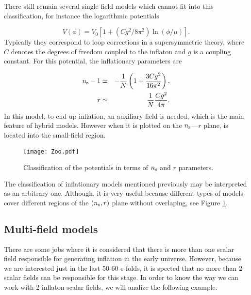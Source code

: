 \documentclass{rmaa}
\def\beq{\begin{equation}}
\def\eeq{\end{equation}}
\def\bea{\begin{eqnarray}}
\def\eea{\end{eqnarray}}
\begin{document}
There still remain several single-field models which cannot fit into this classification, 
for instance the logarithmic potentials \citep{Barrow2}

\beq
V\left(\phi\right) =V_0\left[1+(C g^2/8\pi^2)
\ln\left(\phi/\mu\right)\right].
\eeq
%
Typically they correspond to loop corrections in a supersymmetric theory,
where $C$ denotes the degrees of freedom coupled
to the inflaton and $g$ is a coupling constant.  
%
For this potential, the inflationary parameters are

\bea
n_{\rm s}-1&\simeq& -\frac{1}{N}\left(1+\frac{3C g^2}{16 \pi^2}\right), \nonumber \\
r&\simeq& \frac{1}{N}{Cg^2\over 4\pi}.
 \eea
%
In this model, to end up inflation, an auxiliary field is needed, which is the main feature of
hybrid models. However when it is plotted on the $n_{\rm s}$---$r$ plane, is located into the
small-field region.
\\

\begin{figure}[h!]
\begin{center}
  \texttt{[image: Zoo.pdf]}
	\caption{Classification of the
potentials in terms of $n_{\rm s}$ and $r$ parameters. }
\label{fig:parameters}
\end{center}
\end{figure}

The classification of inflationary models mentioned previously may be interpreted as an 
arbitrary one. Although, it is very useful because different types of models cover different 
regions of the $(n_{\rm s}, r)$ plane without overlaping, see Figure \ref{fig:parameters}.

\subsection{Multi-field models}

There are some jobs where it is considered that there is more than one scalar field responsible for generating inflation in the early universe. However, because we are interested just in the last 50-60 e-folds, it is spected that no more than 2 scalar fields can be responsible for this stage. In order to know the way we can work with 2 inflaton scalar fields, we will analize the following example.
\end{document}
